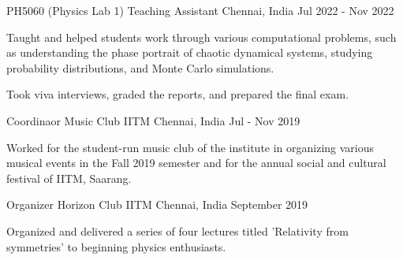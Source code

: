 

\begin{cventries}

\cventry
    {PH5060 (Physics Lab 1)} %
    {Teaching Assistant} %
    {Chennai, India} %
    {Jul 2022 - Nov 2022} %
    {
      \begin{cvitems} %
        \item {Taught and helped students work through various computational problems, such as understanding the phase portrait of chaotic dynamical systems, studying probability distributions, and Monte Carlo simulations.} \item {Took viva interviews, graded the reports, and prepared the final exam.}
      \end{cvitems}
    }

  \cventry
    {Coordinaor} %
    {Music Club IITM} %
    {Chennai, India} %
    {Jul - Nov 2019} %
    {
      \begin{cvitems} %
        \item {Worked for the student-run music club of the institute in organizing various musical events in the Fall 2019 semester and for the annual social and cultural festival of IITM, Saarang.}
      \end{cvitems}
    }


  \cventry
    {Organizer} %
    {Horizon Club IITM} %
    {Chennai, India} %
    {September 2019} %
    {
      \begin{cvitems} %
        \item {Organized and delivered a series of four lectures titled 'Relativity from symmetries' to beginning physics enthusiasts.}
      \end{cvitems}
    }



\end{cventries}

